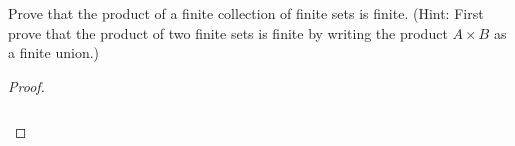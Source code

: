 Prove that the product of a finite collection of finite sets is finite.
(Hint: First prove that the product of two finite sets is finite by writing the
product $A\times B$ as a finite union.)

    \begin{proof}\renewcommand{\qedsymbol}{}\ \\\\
        \begin{align*}
        \end{align*}
    \end{proof}